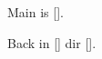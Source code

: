 \documentclass{article}
\begin{document}
Main is [\currfilename].

Back in [\currfilename] dir [\currfiledir].
\end{document}
